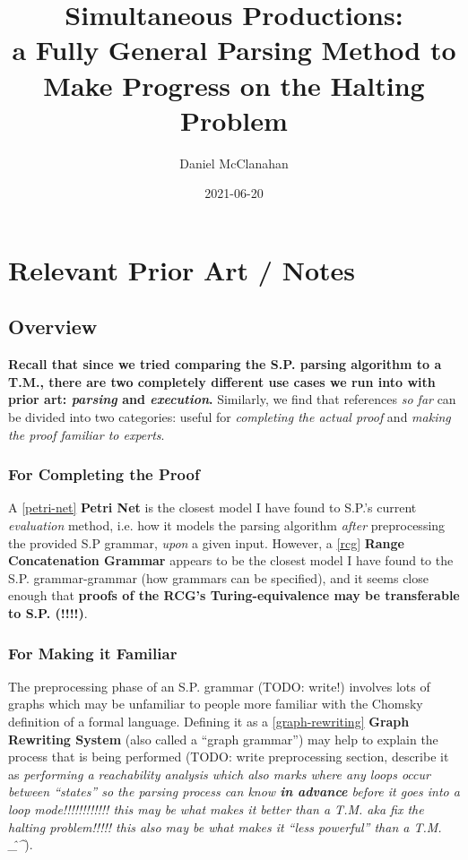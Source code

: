 \documentclass{article}
\title{Simultaneous Productions: \\ a Fully General Parsing Method to Make Progress on the Halting Problem}
\date{2021-06-20}
\author{Daniel McClanahan}
\begin{document}
\maketitle

\section{Relevant Prior Art / Notes}
\subsection{Overview}

\textbf{Recall that since we tried comparing the S.P. parsing algorithm to a T.M., there are two completely different use cases we run into with prior art: \textit{parsing} and \textit{execution}.} Similarly, we find that references \textit{so far} can be divided into two categories: useful for \textit{completing the actual proof} and \textit{making the proof familiar to experts}.

\subsubsection{For Completing the Proof}
\label{completing-the-proof}

A \ref{petri-net} \textbf{Petri Net} is the closest model I have found to S.P.'s current \textit{evaluation} method, i.e. how it models the parsing algorithm \textit{after} preprocessing the provided S.P grammar, \textit{upon} a given input. However, a \ref{rcg} \textbf{Range Concatenation Grammar} appears to be the closest model I have found to the S.P. grammar-grammar (how grammars can be specified), and it seems close enough that \textbf{proofs of the RCG's Turing-equivalence may be transferable to S.P. (!!!!)}.

\subsubsection{For Making it Familiar}
\label{making-it-familiar}

The preprocessing phase of an S.P. grammar (TODO: write!) involves lots of graphs which may be unfamiliar to people more familiar with the Chomsky definition of a formal language. Defining it as a \ref{graph-rewriting} \textbf{Graph Rewriting System} (also called a ``graph grammar'') may help to explain the process that is being performed (TODO: write preprocessing section, describe it as \textit{performing a reachability analysis which also marks where any loops occur between ``states'' so the parsing process can know \textbf{in advance} before it goes into a loop mode!!!!!!!!!!!! this may be what makes it better than a T.M. aka fix the halting problem!!!!! this also may be what makes it ``less powerful'' than a T.M. \^\_\^}).
\end{document}
